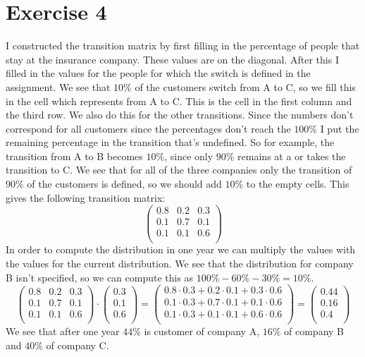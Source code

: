\documentclass[a4paper]{article}
\begin{document}
\section*{Exercise 4}
I constructed the transition matrix by first filling in the percentage of people that stay at the insurance company. These values are on the diagonal. After this I filled in the values for the people for which the switch is defined in the assignment. We see that $10 \%$ of the customers switch from A to C, so we fill this in the cell which represents from A to C. This is the cell in the first column and the third row. We also do this for the other transitions. Since the numbers don't correspond for all customers since the percentages don't reach the $100 \%$ I put the remaining percentage in the transition that's undefined. So for example, the transition from A to B becomes $10 \%$, since only $90 \%$ remains at a or takes the transition to C. We see that for all of the three companies only the transition of $90 \%$ of the customers is defined, so we should add $10 \%$ to the empty cells. This gives the following transition matrix:
\[
\left(
\begin{array}{ccc}
0.8 & 0.2 & 0.3 \\
0.1 & 0.7 & 0.1 \\
0.1 & 0.1 & 0.6 \\
\end{array}
\right)
\]
In order to compute the distribution in one year we can multiply the values with the values for the current distribution. We see that the distribution for company B isn't specified, so we can compute this as $100 \% - 60 \% - 30 \% = 10 \%$.
\[
\left(
\begin{array}{ccc}
0.8 & 0.2 & 0.3 \\
0.1 & 0.7 & 0.1 \\
0.1 & 0.1 & 0.6 \\
\end{array}
\right)
\cdot
\left(
\begin{array}{ccc}
0.3 \\
0.1 \\
0.6 \\
\end{array}
\right)
=
\left(
\begin{array}{c}
0.8 \cdot 0.3 + 0.2 \cdot 0.1 + 0.3 \cdot 0.6 \\
0.1 \cdot 0.3 + 0.7 \cdot 0.1 + 0.1 \cdot 0.6 \\
0.1 \cdot 0.3 + 0.1 \cdot 0.1 + 0.6 \cdot 0.6 \\
\end{array}
\right)
=
\left(
\begin{array}{c}
0.44 \\
0.16 \\
0.4 \\
\end{array}
\right)
\]
We see that after one year $44 \%$ is customer of company A, $16 \%$ of company B and $40 \%$ of company C.
\end{document}
